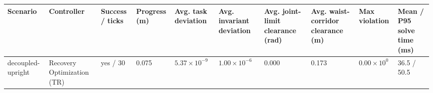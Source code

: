 \begin{tabular}{llllllllll}
\toprule
Scenario & Controller & Success / ticks & Progress (m) & Avg. task deviation & Avg. invariant deviation & Avg. joint-limit clearance (rad) & Avg. waist-corridor clearance (m) & Max violation & Mean / P95 solve time (ms) \\
\midrule
decoupled-upright & Recovery Optimization (TR) & yes / 30 & 0.075 & $5.37\times 10^{-9}$ & $1.00\times 10^{-6}$ & 0.000 & 0.173 & $0.00\times 10^{0}$ & 36.5 / 50.5 \\
\bottomrule
\end{tabular}
